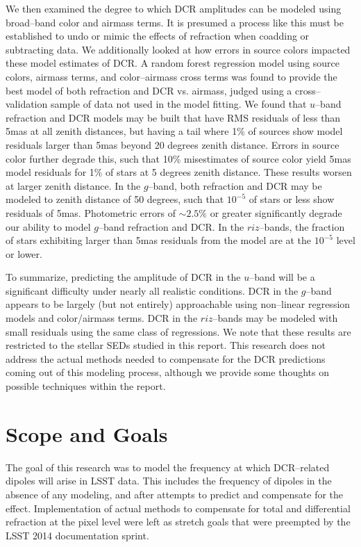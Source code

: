 \documentclass[DM,toc]{lsstdoc}
\begin{document}
We then examined the degree to which DCR amplitudes can be modeled
using broad--band color and airmass terms.  It is presumed a process
like this must be established to undo or mimic the effects of
refraction when coadding or subtracting data.  We additionally looked
at how errors in source colors impacted these model estimates of DCR.
A random forest regression model using source colors, airmass terms,
and color--airmass cross terms was found to provide the best model of
both refraction and DCR vs. airmass, judged using a cross--validation
sample of data not used in the model fitting.  We found that $u$--band
refraction and DCR models may be built that have RMS residuals of less
than 5mas at all zenith distances, but having a tail where 1\% of
sources show model residuals larger than 5mas beyond 20 degrees zenith
distance.  Errors in source color further degrade this, such that 10\%
misestimates of source color yield 5mas model residuals for 1\% of
stars at 5 degrees zenith distance.  These results worsen at larger
zenith distance.  In the $g$--band, both refraction and DCR may be
modeled to zenith distance of 50 degrees, such that $10^{-5}$ of stars
or less show residuals of 5mas.  Photometric errors of $\sim 2.5\%$ or
greater significantly degrade our ability to model $g$--band
refraction and DCR.  In the $riz$--bands, the fraction of stars
exhibiting larger than 5mas residuals from the model are at the
$10^{-5}$ level or lower.

To summarize, predicting the amplitude of DCR in the $u$--band will be
a significant difficulty under nearly all realistic conditions.  DCR
in the $g$--band appears to be largely (but not entirely) approachable
using non--linear regression models and color/airmass terms.  DCR in
the $riz$--bands may be modeled with small residuals using the same
class of regressions.  We note that these results are restricted to
the stellar SEDs studied in this report.  This research does not
address the actual methods needed to compensate for the DCR
predictions coming out of this modeling process, although we provide
some thoughts on possible techniques within the report.

\section{Scope and Goals}

The goal of this research was to model the frequency at which
DCR--related dipoles will arise in LSST data.  This includes the
frequency of dipoles in the absence of any modeling, and after
attempts to predict and compensate for the effect.  Implementation of
actual methods to compensate for total and differential refraction at
the pixel level were left as stretch goals that were preempted by the
LSST 2014 documentation sprint.
\end{document}

